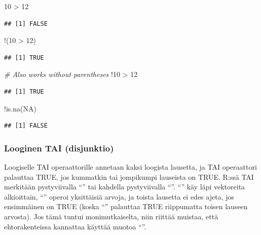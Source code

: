 \documentclass[
]{book}
\newenvironment{Shaded}{\begin{snugshade}}{\end{snugshade}}
\newcommand{\CommentTok}[1]{\textcolor[rgb]{0.56,0.35,0.01}{\textit{#1}}}
\newcommand{\ConstantTok}[1]{\textcolor[rgb]{0.00,0.00,0.00}{#1}}
\newcommand{\DecValTok}[1]{\textcolor[rgb]{0.00,0.00,0.81}{#1}}
\newcommand{\FunctionTok}[1]{\textcolor[rgb]{0.00,0.00,0.00}{#1}}
\newcommand{\NormalTok}[1]{#1}
\newcommand{\SpecialCharTok}[1]{\textcolor[rgb]{0.00,0.00,0.00}{#1}}
\begin{document}
\begin{Shaded}
\begin{Highlighting}[]
\DecValTok{10} \SpecialCharTok{\textgreater{}} \DecValTok{12}
\end{Highlighting}
\end{Shaded}

\begin{verbatim}
## [1] FALSE
\end{verbatim}

\begin{Shaded}
\begin{Highlighting}[]
\SpecialCharTok{!}\NormalTok{(}\DecValTok{10} \SpecialCharTok{\textgreater{}} \DecValTok{12}\NormalTok{)}
\end{Highlighting}
\end{Shaded}

\begin{verbatim}
## [1] TRUE
\end{verbatim}

\begin{Shaded}
\begin{Highlighting}[]
\CommentTok{\# Also works without parentheses}
\SpecialCharTok{!}\DecValTok{10} \SpecialCharTok{\textgreater{}} \DecValTok{12}
\end{Highlighting}
\end{Shaded}

\begin{verbatim}
## [1] TRUE
\end{verbatim}

\begin{Shaded}
\begin{Highlighting}[]
\SpecialCharTok{!}\FunctionTok{is.na}\NormalTok{(}\ConstantTok{NA}\NormalTok{)}
\end{Highlighting}
\end{Shaded}

\begin{verbatim}
## [1] FALSE
\end{verbatim}

\hypertarget{looginen-tai-disjunktio}{%
\subsubsection{Looginen TAI (disjunktio)}\label{looginen-tai-disjunktio}}

Loogiselle TAI operaattorille annetaan kaksi loogista lausetta, ja TAI operaattori palauttaa TRUE, jos kummatkin tai jompikumpi lauseista on TRUE. R:ssä TAI merkitään pystyviivalla ``\textbar{}'' tai kahdella pystyviivalla ``\textbar\textbar{}''. ``\textbar{}'' käy läpi vektoreita alkioittain, ``\textbar\textbar{}'' operoi yksittäisiä arvoja, ja toista lausetta ei edes ajeta, jos ensimmäinen on TRUE (koska ``\textbar\textbar{}'' palauttaa TRUE riippumatta toisen lauseen arvosta). Jos tämä tuntui monimutkaiselta, niin riittää muistaa, että ehtorakenteissa kannattaa käyttää muotoa ``\textbar\textbar{}''.
\end{document}
